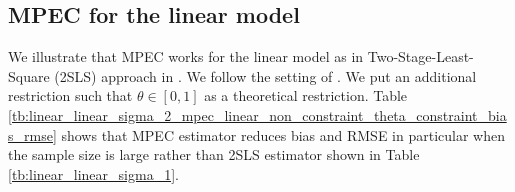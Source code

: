 \documentclass[11pt, a4paper]{article}
\begin{document}
  






\subsection{MPEC for the linear model}

We illustrate that MPEC works for the linear model as in Two-Stage-Least-Square (2SLS) approach in \cite{matsumura2023resolving}. 
We follow the setting of \cite{matsumura2023resolving}.
We put an additional restriction such that $\theta\in[0,1]$ as a theoretical restriction. 
Table \ref{tb:linear_linear_sigma_2_mpec_linear_non_constraint_theta_constraint_bias_rmse} shows that MPEC estimator reduces bias and RMSE in particular when the sample size is large rather than 2SLS estimator shown in Table \ref{tb:linear_linear_sigma_1}.
\end{document}
